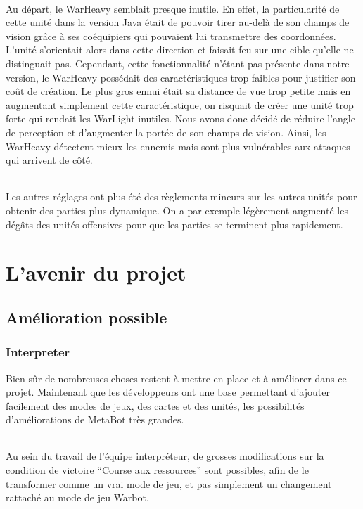 \documentclass{report}
\begin{document}
\paragraph{}
Au départ, le WarHeavy semblait presque inutile. En effet, la particularité de cette unité dans la version Java était de pouvoir tirer au-delà de son champs de vision grâce à ses coéquipiers qui pouvaient lui transmettre des coordonnées. L’unité s’orientait alors dans cette direction et faisait feu sur une cible qu’elle ne distinguait pas. Cependant, cette fonctionnalité n’étant pas présente dans notre version, le WarHeavy possédait des caractéristiques trop faibles pour justifier son coût de création. Le plus gros ennui était sa distance de vue trop petite mais en augmentant simplement cette caractéristique, on risquait de créer une unité trop forte qui rendait les WarLight inutiles. \newline
Nous avons donc décidé de réduire l’angle de perception et d’augmenter la portée de son champs de vision. Ainsi, les WarHeavy détectent mieux les ennemis mais sont plus vulnérables aux attaques qui arrivent de côté.
\paragraph{}
Les autres réglages ont plus été des règlements mineurs sur les autres unités pour obtenir des parties plus dynamique. On a par exemple légèrement augmenté les dégâts des unités offensives pour que les parties se terminent plus rapidement.


\newpage

\part{L'avenir du projet}
\chapter{Amélioration possible}
\section{Interpreter}
Bien sûr de nombreuses choses restent à mettre en place et à améliorer dans ce projet. Maintenant que les développeurs ont une base permettant d’ajouter facilement des modes de jeux, des cartes et des unités, les possibilités d’améliorations de MetaBot très grandes. 
\paragraph{}
Au sein du travail de l’équipe interpréteur, de grosses modifications sur la condition de victoire “Course aux ressources” sont possibles, afin de le transformer comme un vrai mode de jeu, et pas simplement un changement rattaché au mode de jeu Warbot. 
\end{document}
